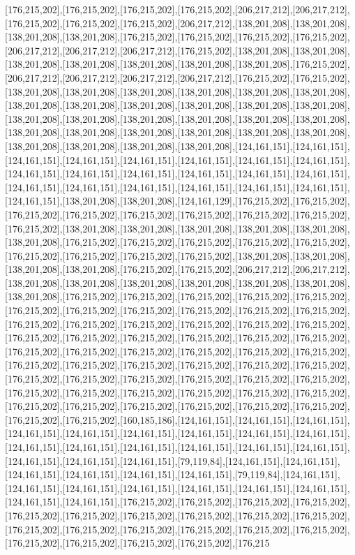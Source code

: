 [176,215,202],[176,215,202],[176,215,202],[176,215,202],[206,217,212],[206,217,212],[176,215,202],[176,215,202],[176,215,202],[206,217,212],[138,201,208],[138,201,208],[138,201,208],[138,201,208],[176,215,202],[176,215,202],[176,215,202],[176,215,202],[206,217,212],[206,217,212],[206,217,212],[176,215,202],[138,201,208],[138,201,208],[138,201,208],[138,201,208],[138,201,208],[138,201,208],[138,201,208],[176,215,202],[206,217,212],[206,217,212],[206,217,212],[206,217,212],[176,215,202],[176,215,202],[138,201,208],[138,201,208],[138,201,208],[138,201,208],[138,201,208],[138,201,208],[138,201,208],[138,201,208],[138,201,208],[138,201,208],[138,201,208],[138,201,208],[138,201,208],[138,201,208],[138,201,208],[138,201,208],[138,201,208],[138,201,208],[138,201,208],[138,201,208],[138,201,208],[138,201,208],[138,201,208],[138,201,208],[138,201,208],[138,201,208],[138,201,208],[138,201,208],[124,161,151],[124,161,151],[124,161,151],[124,161,151],[124,161,151],[124,161,151],[124,161,151],[124,161,151],[124,161,151],[124,161,151],[124,161,151],[124,161,151],[124,161,151],[124,161,151],[124,161,151],[124,161,151],[124,161,151],[124,161,151],[124,161,151],[124,161,151],[124,161,151],[138,201,208],[138,201,208],[124,161,129],[176,215,202],[176,215,202],[176,215,202],[176,215,202],[176,215,202],[176,215,202],[176,215,202],[176,215,202],[176,215,202],[138,201,208],[138,201,208],[138,201,208],[138,201,208],[138,201,208],[138,201,208],[176,215,202],[176,215,202],[176,215,202],[176,215,202],[176,215,202],[176,215,202],[176,215,202],[176,215,202],[176,215,202],[138,201,208],[138,201,208],[138,201,208],[138,201,208],[176,215,202],[176,215,202],[206,217,212],[206,217,212],[138,201,208],[138,201,208],[138,201,208],[138,201,208],[138,201,208],[138,201,208],[138,201,208],[176,215,202],[176,215,202],[176,215,202],[176,215,202],[176,215,202],[176,215,202],[176,215,202],[176,215,202],[176,215,202],[176,215,202],[176,215,202],[176,215,202],[176,215,202],[176,215,202],[176,215,202],[176,215,202],[176,215,202],[176,215,202],[176,215,202],[176,215,202],[176,215,202],[176,215,202],[176,215,202],[176,215,202],[176,215,202],[176,215,202],[176,215,202],[176,215,202],[176,215,202],[176,215,202],[176,215,202],[176,215,202],[176,215,202],[176,215,202],[176,215,202],[176,215,202],[176,215,202],[176,215,202],[176,215,202],[176,215,202],[176,215,202],[176,215,202],[176,215,202],[176,215,202],[176,215,202],[176,215,202],[176,215,202],[176,215,202],[176,215,202],[176,215,202],[176,215,202],[176,215,202],[176,215,202],[176,215,202],[176,215,202],[160,185,186],[124,161,151],[124,161,151],[124,161,151],[124,161,151],[124,161,151],[124,161,151],[124,161,151],[124,161,151],[124,161,151],[124,161,151],[124,161,151],[124,161,151],[124,161,151],[124,161,151],[124,161,151],[124,161,151],[124,161,151],[124,161,151],[79,119,84],[124,161,151],[124,161,151],[124,161,151],[124,161,151],[124,161,151],[124,161,151],[79,119,84],[124,161,151],[124,161,151],[124,161,151],[124,161,151],[124,161,151],[124,161,151],[124,161,151],[124,161,151],[124,161,151],[176,215,202],[176,215,202],[176,215,202],[176,215,202],[176,215,202],[176,215,202],[176,215,202],[176,215,202],[176,215,202],[176,215,202],[176,215,202],[176,215,202],[176,215,202],[176,215,202],[176,215,202],[176,215,202],[176,215,202],[176,215,202],[176,215,202],[176,215,202],[176,215